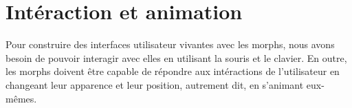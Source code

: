 \documentclass[a4paper,10pt,twoside]{book}
\begin{document}






\section{Intéraction et animation}

Pour construire des interfaces utilisateur vivantes avec les morphs,
nous avons besoin de pouvoir interagir avec elles en utilisant la
souris et le clavier.
En outre, les morphs doivent être capable de répondre aux
intéractions de l'utilisateur en changeant leur apparence et leur
position, autrement dit, en s'animant eux-mêmes.
\end{document}
